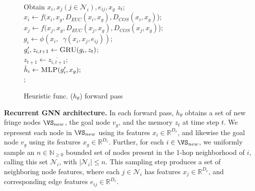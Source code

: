 \begin{figure}
    \begin{algorithm}[H]
    	\caption{Heuristic func. ($h_\theta$) forward pass}\label{alg:htheta_alg}
    	 Obtain $x_i, x_j (j \in \mathcal{N}_i), e_{ij}, x_g$ $z_t$;\\
    	 $x_i \leftarrow f(x_i, x_g, D_{EUC}(x_i, x_g), D_{COS}(x_i, x_g)$);\\
     	 $x_j \leftarrow f(x_j, x_g, D_{EUC}(x_j, x_g), D_{COS}(x_j, x_g)$); \\
    
    	 $g_i \leftarrow \phi(x_i, \mathop{\oplus_{j \in \mathcal{N}_i}} \gamma(x_i, x_j, e_{ij}))$;\\
         $g^{\prime}_i, z_{i, t+1} \leftarrow \textsc{GRU}(g_i, z_t)$;\\
    	 $z_{t+1} \leftarrow \overline{z_{i, t+1}}$;\\ 
    	 $\hat{h}_i \leftarrow \textsc{MLP}(g^{\prime}_i, x_g);$\\
    	;\\
    \end{algorithm}
\end{figure}


\textbf{Recurrent GNN architecture.} In each forward pass, $h_{\theta}$ obtains a set of new fringe nodes $\VS_{new}$, the goal node $v_g$, and the memory $z_t$ at time step $t$. We represent each node in $\VS_{new}$ using its features $x_{i} \in \mathbb{R}^{D_v}$, and likewise the goal node $v_g$ using its features $x_{g} \in \mathbb{R}^{D_v}$. Further, for each $i \in \VS_{new}$, we uniformly sample an $n \in \mathbb{N}_{\geq 0}$ bounded set of nodes present in the 1-hop neighborhood of $i$, calling this set $\mathcal{N}_i$, with $|\mathcal{N}_i| \leq n$. This sampling step produces a set of neighboring node features, where each $j \in \mathcal{N}_i$ has features $x_{j} \in \mathbb{R}^{D_v}$, and corresponding edge features $e_{ij} \in \mathbb{R}^{D_e}$.




